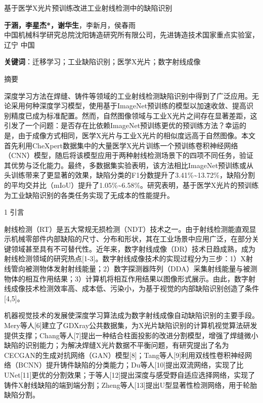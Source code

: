 
基于医学X光片预训练改进工业射线检测中的缺陷识别

\textbf{于涵，李星杰*，谢华生}，李新月，侯春雨\\
中国机械科学研究总院沈阳铸造研究所有限公司，先进铸造技术国家重点实验室，辽宁
中国

\textbf{关键词}：迁移学习；工业缺陷识别；医学X光片；数字射线成像

摘要

深度学习方法在焊缝、铸件等领域的工业射线检测缺陷识别中得到了广泛应用。无论采用何种深度学习模型，使用基于ImageNet预训练的模型以加速收敛、提高识别精度已成为标准配置。然而，自然图像领域与工业X光片之间存在显著差距，这引发了一个问题：是否存在比依赖ImageNet预训练更优的预训练方法？幸运的是，由于成像方式相同，医学X光片与工业X光片的相似度远高于自然图像。本文首先利用CheXpert数据集中的大量医学X光片训练一个预训练卷积神经网络（CNN）模型，随后将该模型应用于两种射线检测场景下的四项不同任务，验证其优势与泛化能力。最终，多数据集实验表明，该方法相比ImageNet预训练或从头训练带来了更显著的效果，缺陷分类的F1分数提升了3.41\%\textasciitilde{}13.72\%，缺陷分割的平均交并比（mIoU）提升了1.05\%\textasciitilde{}6.58\%。研究表明，基于医学X光片的预训练为工业缺陷识别的各类任务实现了无成本的性能提升。

1 引言

射线检测（RT）是五大常规无损检测（NDT）技术之一。由于射线检测能直观显示机械零部件内部缺陷的尺寸、分布和形状，其在工业场景中应用广泛，在部分关键领域甚至具有不可替代性。近年来，数字射线成像（DR）技术日趋成熟，成为射线检测领域的研究热点{[}1-3{]}。数字射线成像技术的实现过程分为三步：1）X射线管向被测物体发射射线能量；2）数字探测器阵列（DDA）采集射线能量与被测物体的相互作用结果；3）计算机将相互作用结果以图像形式展示。由此，数字射线成像技术检测效率高、成本低、污染小，为基于视觉的内部缺陷识别创造了条件{[}4,5{]}。

机器视觉技术的发展使深度学习算法成为数字射线成像自动缺陷识别的主要手段。Mery等人{[}6{]}建立了GDXray公共数据集，为X光片缺陷识别的计算机视觉算法研发提供支撑；Chang等人{[}7{]}提出一种结合柱面投影的改进分割模型，增强了焊缝微小缺陷的识别能力；为解决焊缝X光片数据不平衡问题，有研究提出了名为CECGAN的生成对抗网络（GAN）模型{[}8{]}；Tang等人{[}9{]}利用双线性卷积神经网络（BCNN）提升铸件缺陷的分类能力；Du等人{[}10{]}提出双流网络，实现了比UNet{[}11{]}更优的分割效果；于等人{[}12{]}提出深度与感受野自适应选择网络，实现了铸件X射线缺陷的端到端分割；Zheng等人{[}13{]}提出U型显著性检测网络，用于轮胎缺陷分割。

